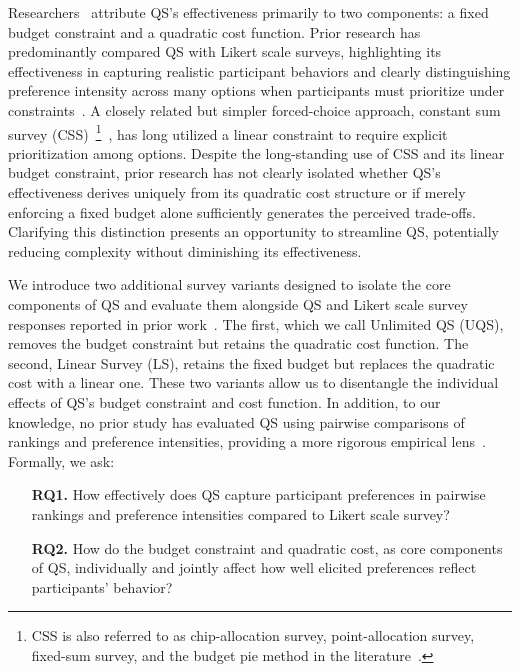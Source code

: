 Researchers~\cite{chengCanShowWhat2021, cavaille2024cares} attribute QS's effectiveness primarily to two components: a fixed budget constraint and a quadratic cost function. Prior research has predominantly compared QS with Likert scale surveys, highlighting its effectiveness in capturing realistic participant behaviors and clearly distinguishing preference intensity across many options when participants must prioritize under constraints~\cite{chengCanShowWhat2021, cavaille2024cares}. A closely related but simpler forced-choice approach, constant sum survey (CSS)~\footnote{CSS is also referred to as chip-allocation survey, point-allocation survey, fixed-sum survey, and the budget pie method in the literature~\cite{harwoodUnderstandingImplicitExplicit2019, thomas2004using, robertsWeightApproximationsMultiattribute2002, zhuSelfestimationWeightParameter1991, mciverUsingBudgetPies1976, toepoelSmileysStarsHearts2019}.}~\cite{metfesselProposalQuantitativeReporting1947}, has long utilized a linear constraint to require explicit prioritization among options. Despite the long-standing use of CSS and its linear budget constraint, prior research has not clearly isolated whether QS's effectiveness derives uniquely from its quadratic cost structure or if merely enforcing a fixed budget alone sufficiently generates the perceived trade-offs. Clarifying this distinction presents an opportunity to streamline QS, potentially reducing complexity without diminishing its effectiveness.


We introduce two additional survey variants designed to isolate the core components of QS and evaluate them alongside QS and Likert scale survey responses reported in prior work~\cite{chengCanShowWhat2021}. The first, which we call Unlimited QS (UQS), removes the budget constraint but retains the quadratic cost function. The second, Linear Survey (LS), retains the fixed budget but replaces the quadratic cost with a linear one. These two variants allow us to disentangle the individual effects of QS's budget constraint and cost function. In addition, to our knowledge, no prior study has evaluated QS using pairwise comparisons of rankings and preference intensities, providing a more rigorous empirical lens~\cite{collewet2023preference}. Formally, we ask:

\begin{itemize}
    \item [\textbf{RQ1.}] How effectively does QS capture participant preferences in pairwise rankings and preference intensities compared to Likert scale survey?
    \item [\textbf{RQ2.}] How do the budget constraint and quadratic cost, as core components of QS, individually and jointly affect how well elicited preferences reflect participants' behavior?
\end{itemize}

